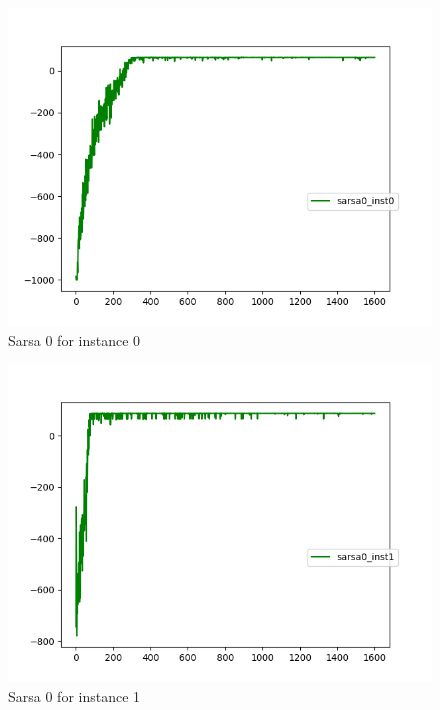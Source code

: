 \documentclass{article}
\begin{document}
\begin{figure}[H]
  \centering
  \includegraphics[scale=0.5]{images/sarsa0_instance0}
  \caption{Sarsa 0 for instance 0}
  \label{fig:s0i0}
\end{figure}
\begin{figure}[H]
  \centering
  \includegraphics[scale=0.5]{images/sarsa0_instance_1}
  \caption{Sarsa 0 for instance 1}
  \label{fig:s0i1}
\end{figure}
\end{document}

